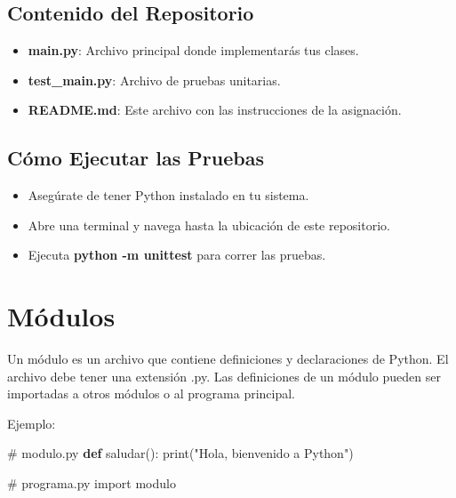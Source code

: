 \documentclass[
  a4paper,
  DIV=11,
  numbers=noendperiod,
  onepage,
  openany]{scrreprt}
\newenvironment{Shaded}{\begin{snugshade}}{\end{snugshade}}
\newcommand{\BuiltInTok}[1]{\textcolor[rgb]{0.00,0.23,0.31}{#1}}
\newcommand{\CommentTok}[1]{\textcolor[rgb]{0.37,0.37,0.37}{#1}}
\newcommand{\ImportTok}[1]{\textcolor[rgb]{0.00,0.46,0.62}{#1}}
\newcommand{\KeywordTok}[1]{\textcolor[rgb]{0.00,0.23,0.31}{\textbf{#1}}}
\newcommand{\NormalTok}[1]{\textcolor[rgb]{0.00,0.23,0.31}{#1}}
\newcommand{\StringTok}[1]{\textcolor[rgb]{0.13,0.47,0.30}{#1}}
\providecommand{\tightlist}{%
  \setlength{\itemsep}{0pt}\setlength{\parskip}{0pt}}\usepackage{longtable,booktabs,array}
\begin{document}
\begin{tcolorbox}
\section{Contenido del Repositorio}\label{contenido-del-repositorio}

\begin{itemize}
\tightlist
\item
  \textbf{main.py}: Archivo principal donde implementarás tus clases.
\item
  \textbf{test\_main.py}: Archivo de pruebas unitarias.
\item
  \textbf{README.md}: Este archivo con las instrucciones de la
  asignación.
\end{itemize}

\section{Cómo Ejecutar las Pruebas}\label{cuxf3mo-ejecutar-las-pruebas}

\begin{itemize}
\tightlist
\item
  Asegúrate de tener Python instalado en tu sistema.
\item
  Abre una terminal y navega hasta la ubicación de este repositorio.
\item
  Ejecuta \textbf{python -m unittest} para correr las pruebas.
\end{itemize}

\chapter{Módulos}\label{muxf3dulos}

Un módulo es un archivo que contiene definiciones y declaraciones de
Python. El archivo debe tener una extensión .py. Las definiciones de un
módulo pueden ser importadas a otros módulos o al programa principal.

Ejemplo:

\begin{Shaded}
\begin{Highlighting}[]
\CommentTok{\# modulo.py}
\KeywordTok{def}\NormalTok{ saludar():}
    \BuiltInTok{print}\NormalTok{(}\StringTok{"Hola, bienvenido a Python"}\NormalTok{)}
\end{Highlighting}
\end{Shaded}

\begin{Shaded}
\begin{Highlighting}[]
\CommentTok{\# programa.py}
\ImportTok{import}\NormalTok{ modulo}


\end{Highlighting}
\end{Shaded}
\end{tcolorbox}
\end{document}
